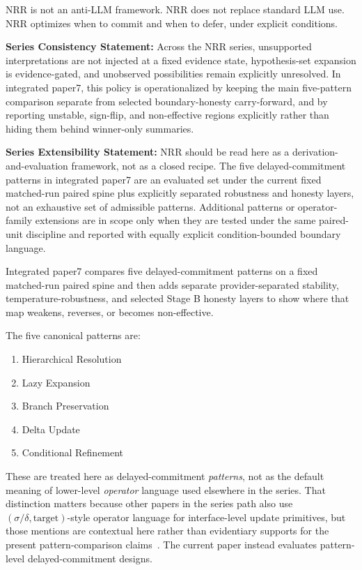\documentclass[11pt,a4paper]{article}
\begin{document}
NRR is not an anti-LLM framework.
NRR does not replace standard LLM use.
NRR optimizes when to commit and when to defer, under explicit conditions.

\textbf{Series Consistency Statement:}
Across the NRR series, unsupported interpretations are not injected at a fixed evidence state, hypothesis-set expansion is evidence-gated, and unobserved possibilities remain explicitly unresolved. In integrated paper7, this policy is operationalized by keeping the main five-pattern comparison separate from selected boundary-honesty carry-forward, and by reporting unstable, sign-flip, and non-effective regions explicitly rather than hiding them behind winner-only summaries.

\textbf{Series Extensibility Statement:}
NRR should be read here as a derivation-and-evaluation framework, not as a closed recipe. The five delayed-commitment patterns in integrated paper7 are an evaluated set under the current fixed matched-run paired spine plus explicitly separated robustness and honesty layers, not an exhaustive set of admissible patterns. Additional patterns or operator-family extensions are in scope only when they are tested under the same paired-unit discipline and reported with equally explicit condition-bounded boundary language.

Integrated paper7 compares five delayed-commitment patterns on a fixed matched-run paired spine and then adds separate provider-separated stability, temperature-robustness, and selected Stage B honesty layers to show where that map weakens, reverses, or becomes non-effective.

The five canonical patterns are:
\begin{enumerate}
  \item Hierarchical Resolution
  \item Lazy Expansion
  \item Branch Preservation
  \item Delta Update
  \item Conditional Refinement
\end{enumerate}

These are treated here as delayed-commitment \emph{patterns}, not as the default meaning of lower-level \emph{operator} language used elsewhere in the series. That distinction matters because other papers in the series path also use \((\sigma/\delta,\text{target})\)-style operator language for interface-level update primitives, but those mentions are contextual here rather than evidentiary supports for the present pattern-comparison claims~\cite{saito2026phi,saito2026transfer,saito2026coupled}. The current paper instead evaluates pattern-level delayed-commitment designs.
\end{document}
